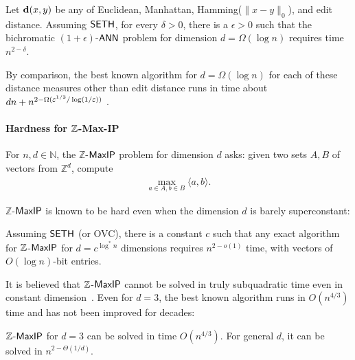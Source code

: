 \begin{theorem}[\cite{r18}]\label{thm:r18}
Let $\mathbf{d}(x,y)$ be any of Euclidean, Manhattan, Hamming($\| x - y \|_0$), and edit distance. Assuming ${\sf SETH}$, for every $\delta > 0$, there is a $\epsilon > 0$ such that the bichromatic $(1+\epsilon)$-${\sf ANN}$ problem for dimension $d = \Omega(\log n)$ requires time $n^{2-\delta}$.
\end{theorem}

By comparison, the best known algorithm for $d = \Omega(\log n)$ for each of these distance measures other than edit distance runs in time about $dn + n^{2 - \Omega(\varepsilon^{1/3}/\log(1/\varepsilon))}$ \cite{acw16}.



\paragraph*{Hardness for ${\mathbb Z}$-Max-IP}




\begin{problem}\label{pro:Z_maxip}
For $n,d \in \mathbb{N}$, the $\mathbb{Z}$-${\sf MaxIP}$ problem for dimension $d$ asks: given two sets $A,B$ of vectors from $\mathbb{Z}^d$, compute
\begin{align*}
\max_{ a \in A, b \in B } \langle a , b \rangle.
\end{align*}
\end{problem}

$\mathbb{Z}$-${\sf MaxIP}$ is known to be hard even when the dimension $d$ is barely superconstant:

\begin{theorem} \label{thm:maxiphard}
Assuming ${\sf SETH}$ (or {\sf OVC}), there is a constant $c$ such that any exact algorithm for ${\mathbb Z}$-${\sf MaxIP}$ for $d = c^{\log^* n}$ dimensions requires $n^{2-o(1)}$ time, with vectors of $O(\log n)$-bit entries.
\end{theorem}

It is believed that ${\mathbb Z}$-${\sf MaxIP}$ cannot be solved in truly subquadratic time even in constant dimension~\cite{c18}. Even for $d=3$, the best known algorithm runs in $O(n^{4/3})$ time and has not been improved for decades:

\begin{theorem}\label{thm:maxiplowdim}
${\mathbb Z}$-${\sf MaxIP}$ for $d=3$ can be solved in time $O(n^{4/3})$. For general $d$, it can be solved in $n^{2- \Theta(1/d)}$.
\end{theorem}

